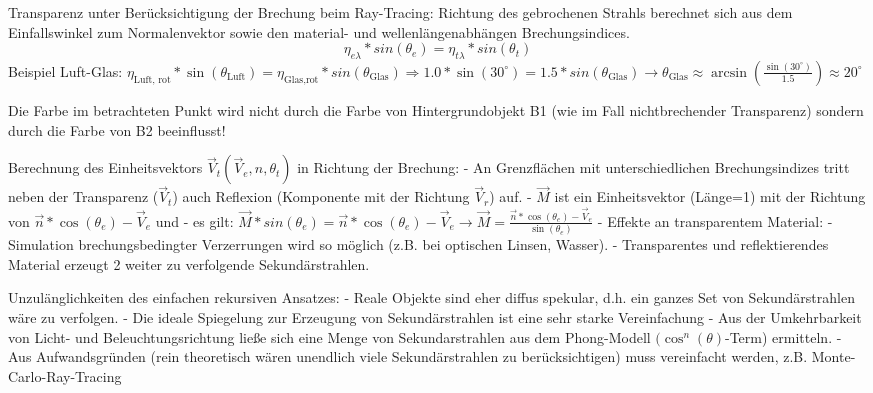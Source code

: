 \documentclass[10pt,landscape]{article}
\begin{document}
\begin{multicols}{3}
  
  Transparenz unter Berücksichtigung der Brechung beim Ray-Tracing: Richtung des gebrochenen Strahls berechnet sich aus dem Einfallswinkel zum Normalenvektor sowie den material- und wellenlängenabhängen Brechungsindices.
  $$\eta_{e\lambda}*sin(\theta_e) = \eta_{t\lambda}*sin(\theta_t)$$
  Beispiel Luft-Glas: $\eta_{\text{Luft, rot}}*\sin(\theta_{\text{Luft}})=\eta_{\text{Glas,rot}}*sin(\theta_{\text{Glas}}) \Rightarrow 1.0*\sin(30^\circ)=1.5*sin(\theta_{\text{Glas}})\rightarrow \theta_{\text{Glas}} \approx \arcsin(\frac{\sin(30^\circ)}{1.5})\approx 20^\circ$
  
  Die Farbe im betrachteten Punkt wird nicht durch die Farbe von Hintergrundobjekt B1 (wie im Fall nichtbrechender Transparenz) sondern durch die Farbe von B2 beeinflusst!
  
  Berechnung des Einheitsvektors $\vec{V}_t(\vec{V}_e,n,\theta_t)$ in Richtung der Brechung:
  - An Grenzflächen mit unterschiedlichen Brechungsindizes tritt neben der Transparenz ($\vec{V}_t$) auch Reflexion (Komponente mit der Richtung $\vec{V}_r$) auf.
  - $\vec{M}$ ist ein Einheitsvektor (Länge=1) mit der Richtung von $\vec{n}*\cos(\theta_e)-\vec{V}_e$ und 
  - es gilt: $\vec{M}*sin(\theta_e)=\vec{n}*\cos(\theta_e)-\vec{V}_e \rightarrow \vec{M}=\frac{\vec{n}*\cos(\theta_e)-\vec{V}_e}{\sin(\theta_e)}$
  - Effekte an transparentem Material:
  - Simulation brechungsbedingter Verzerrungen wird so möglich (z.B. bei optischen Linsen, Wasser).
  - Transparentes und reflektierendes Material erzeugt 2 weiter zu verfolgende Sekundärstrahlen.
  
  
  
  Unzulänglichkeiten des einfachen rekursiven Ansatzes:
  - Reale Objekte sind eher diffus spekular, d.h. ein ganzes Set von Sekundärstrahlen wäre zu verfolgen.
  - Die ideale Spiegelung zur Erzeugung von Sekundärstrahlen ist eine sehr starke Vereinfachung
  - Aus der Umkehrbarkeit von Licht- und Beleuchtungsrichtung ließe sich eine Menge von Sekundarstrahlen aus dem Phong-Modell $(\cos^n(\theta)$-Term) ermitteln.
  - Aus Aufwandsgründen (rein theoretisch wären unendlich viele Sekundärstrahlen zu berücksichtigen) muss vereinfacht werden, z.B. Monte-Carlo-Ray-Tracing
  

\end{multicols}
\end{document}

